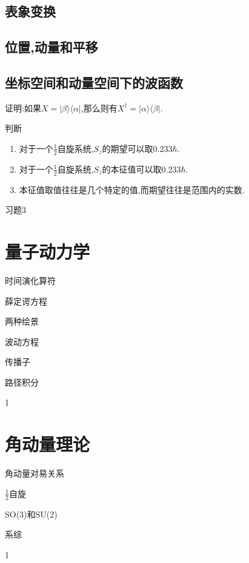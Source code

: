 \documentclass[lang=cn,newtx,10pt,scheme=chinese,thmcnt=section]{elegantbook}
\begin{document}
\section{表象变换}
\section{位置,动量和平移}
\section{坐标空间和动量空间下的波函数}
\begin{problemset}
	\item 证明:如果$X=|\beta\rangle\langle\alpha|$,那么则有$X^\dagger=|\alpha\rangle\langle\beta|$.
	\item 判断
	\begin{enumerate}
		\item 对于一个$\frac12$自旋系统,$S_z$的期望可以取$0.233\hbar$.
		\item 对于一个$\frac12$自旋系统,$S_z$的本征值可以取$0.233\hbar$.
		\item 本征值取值往往是几个特定的值,而期望往往是范围内的实数.
	\end{enumerate}
	\item 习题3
\end{problemset}
\chapter{量子动力学}
\begin{introduction}
	\item 时间演化算符
	\item 薛定谔方程
	\item 两种绘景
	\item 波动方程
	\item 传播子
	\item 路径积分
\end{introduction}
1

\chapter{角动量理论}
\begin{introduction}
	\item 角动量对易关系
	\item $\frac12$自旋
	\item SO(3)和SU(2)
	\item 系综
\end{introduction}
1
\end{document}
